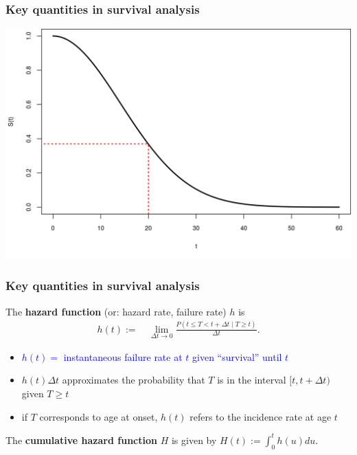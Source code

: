 \documentclass[12pt, 
hyperref={colorlinks=true, linkcolor=blue, urlcolor=cyan},dvipsnames]{beamer}
\begin{document}
\begin{frame}
\frametitle{Key quantities in survival analysis}
\hspace*{-0.5cm}\includegraphics[height=0.8\textheight]{figs/survival_function.png}
\end{frame}

\begin{frame}
\frametitle{Key quantities in survival analysis}
The \textbf{hazard function} (or: hazard rate, failure rate) $h$ is \vspace{-0.2cm}
\begin{align*}
h(t) := & \ \lim_{\Delta t \to 0} \frac{P(t \leq T < t + \Delta t \mid T \geq t)}{\Delta t}.
\end{align*}\vspace{-0.8cm}
\begin{itemize}
\item \textcolor{blue}{$h(t) = $ instantaneous failure rate at $t$ given ``survival'' until $t$}
\item $h(t)\Delta t$ approximates the probability that $T$ is in the interval $[t, t + \Delta t)$ given $T \geq t$
\item if $T$ corresponds to age at onset, $h(t)$ refers to the incidence rate at age $t$
\end{itemize}

The \textbf{cumulative hazard function} $H$ is given by $H(t) := \int_0^t h(u) du$.

\end{frame}
\end{document}
